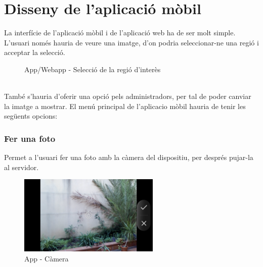 \section{Disseny de l'aplicació mòbil}
	La interfície de l'aplicació mòbil i de l'aplicació web ha de ser molt simple. L'usuari només hauria de veure una imatge, d'on podria seleccionar-ne una regió i acceptar la selecció.\\
	\begin{figure}[H]
		\caption{App/Webapp - Selecció de la regió d'interès}
	\end{figure}
	\noindent
	\\{}
	També s'hauria d'oferir una opció pels administradors, per tal de poder canviar la imatge a mostrar. El menú principal de l'aplicacio mòbil hauria de tenir les següents opcions:
	\subsubsection{Fer una foto}
		Permet a l'usuari fer una foto amb la càmera del dispositiu, per després pujar-la al servidor.\\
		\begin{figure}[H]
			\centering
			\includegraphics[width=0.6\textwidth]{images/cam}
			\caption{App - Càmera}
		\end{figure}
